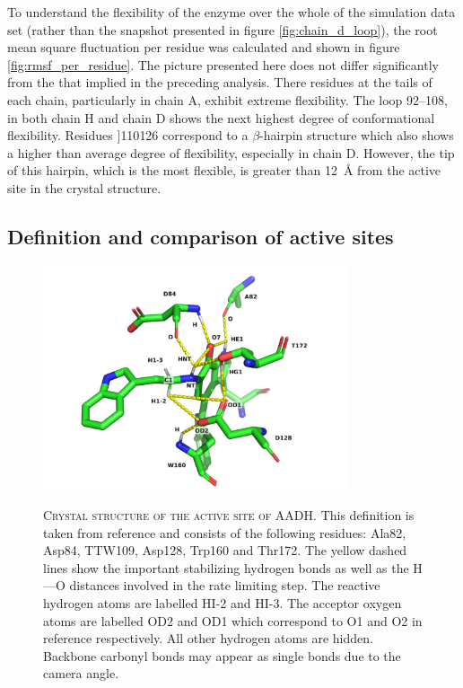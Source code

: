 To understand the flexibility of the enzyme over the whole of the simulation data set (rather than the snapshot presented in figure \ref{fig:chain_d_loop}), the root mean square fluctuation per residue was calculated and shown in figure \ref{fig:rmsf_per_residue}. The picture presented here does not differ significantly from the that implied in the preceding analysis. There residues at the tails of each chain, particularly in chain A, exhibit extreme flexibility. The loop \numrange[range-phrase=\text{--}]{92}{108}, in both chain H and chain D shows the next highest degree of conformational flexibility. Residues \text{--}]{110}{126} correspond to a $\beta$-hairpin structure which also shows a higher than average degree of flexibility, especially in chain D.  However, the tip of this hairpin, which is the most flexible, is greater than \SI{12}{\angstrom} from the active site in the crystal structure.  



\subsection{Definition and comparison of active sites}\label{sec:active_site_comparison}

\begin{figure}
    \centering
    \caption[Crystal structure of the active site of AADH]{\textsc{Crystal structure of the active site of AADH}. This definition is taken from reference \cite{ranaghanInitioQMMM2017} and consists of the following residues: Ala82, Asp84, TTW109, Asp128, Trp160 and Thr172. The yellow dashed lines show the important stabilizing hydrogen bonds as well as the H---O distances involved in the rate limiting step.  The reactive hydrogen atoms are labelled HI-2 and HI-3. The acceptor oxygen atoms are labelled OD2 and OD1 which correspond to O1 and O2 in reference \cite{masgrauAtomicDescriptionEnzyme2006} respectively. All other hydrogen atoms are hidden. Backbone carbonyl bonds may appear as single bonds due to the camera angle.}
    \includegraphics[width=0.8\textwidth]{chapters/aadh/figures/aadh_active_site.png}
    \label{fig:aadh_active_site}
\end{figure}

